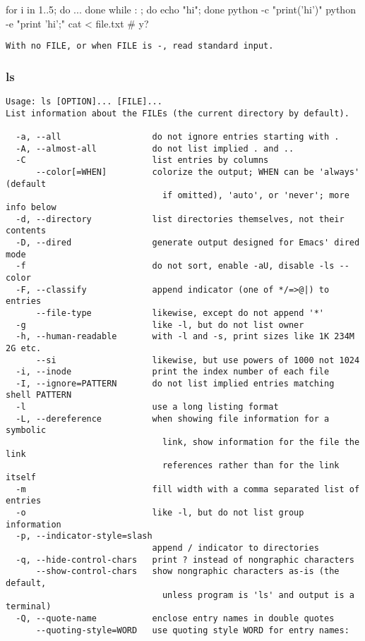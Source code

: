 \documentclass[11pt,a4paper]{article}
\newcommand{\cmd}[1]{
  \subsubsection*{#1}
  \addcontentsline{toc}{subsection}{#1}
}
\begin{document}
\tableofcontents
\begin{bash}
for i in {1..5}; do
  ...
done
while : ; do echo "hi"; done
python -c "print('hi')"
python -e "print 'hi';"
cat < file.txt # y?
\end{bash}

\begin{verbatim}
With no FILE, or when FILE is -, read standard input.
\end{verbatim}


\cmd{ls}
\begin{verbatim}
Usage: ls [OPTION]... [FILE]...
List information about the FILEs (the current directory by default).

  -a, --all                  do not ignore entries starting with .
  -A, --almost-all           do not list implied . and ..
  -C                         list entries by columns
      --color[=WHEN]         colorize the output; WHEN can be 'always' (default
                               if omitted), 'auto', or 'never'; more info below
  -d, --directory            list directories themselves, not their contents
  -D, --dired                generate output designed for Emacs' dired mode
  -f                         do not sort, enable -aU, disable -ls --color
  -F, --classify             append indicator (one of */=>@|) to entries
      --file-type            likewise, except do not append '*'
  -g                         like -l, but do not list owner
  -h, --human-readable       with -l and -s, print sizes like 1K 234M 2G etc.
      --si                   likewise, but use powers of 1000 not 1024
  -i, --inode                print the index number of each file
  -I, --ignore=PATTERN       do not list implied entries matching shell PATTERN
  -l                         use a long listing format
  -L, --dereference          when showing file information for a symbolic
                               link, show information for the file the link
                               references rather than for the link itself
  -m                         fill width with a comma separated list of entries
  -o                         like -l, but do not list group information
  -p, --indicator-style=slash
                             append / indicator to directories
  -q, --hide-control-chars   print ? instead of nongraphic characters
      --show-control-chars   show nongraphic characters as-is (the default,
                               unless program is 'ls' and output is a terminal)
  -Q, --quote-name           enclose entry names in double quotes
      --quoting-style=WORD   use quoting style WORD for entry names:

\end{verbatim}
\end{document}
